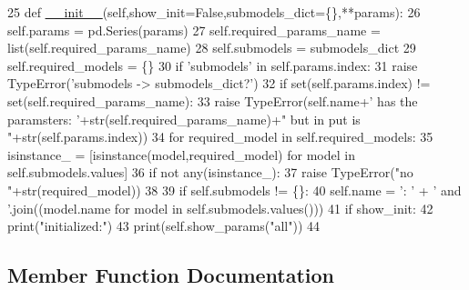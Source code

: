 \begin{DoxyCode}
25     \textcolor{keyword}{def }\hyperlink{classsampler_1_1Sampler_a0ebbb93e5c948bc426658cbdc92bfd12}{\_\_init\_\_}(self,show\_init=False,submodels\_dict=\{\},**params):
26         self.params = pd.Series(params)
27         self.required\_params\_name = list(self.required\_params\_name)
28         self.submodels = submodels\_dict
29         self.required\_models = \{\}
30         \textcolor{keywordflow}{if} \textcolor{stringliteral}{'submodels'} \textcolor{keywordflow}{in} self.params.index:
31             \textcolor{keywordflow}{raise} TypeError(\textcolor{stringliteral}{'submodels -> submodels\_dict?'})
32         \textcolor{keywordflow}{if} set(self.params.index) != set(self.required\_params\_name):
33             \textcolor{keywordflow}{raise} TypeError(self.name+\textcolor{stringliteral}{' has the paramsters: '}+str(self.required\_params\_name)+\textcolor{stringliteral}{" but in put
       is "}+str(self.params.index))
34         \textcolor{keywordflow}{for} required\_model \textcolor{keywordflow}{in} self.required\_models:
35             isinstance\_ =  [isinstance(model,required\_model) \textcolor{keywordflow}{for} model \textcolor{keywordflow}{in} self.submodels.values]
36             \textcolor{keywordflow}{if} \textcolor{keywordflow}{not} any(isinstance\_):
37                 \textcolor{keywordflow}{raise} TypeError(\textcolor{stringliteral}{"no "}+str(required\_model))
38             
39         \textcolor{keywordflow}{if} self.submodels != \{\}:
40             self.name = \textcolor{stringliteral}{': '} + \textcolor{stringliteral}{' and '}.join((model.name \textcolor{keywordflow}{for} model \textcolor{keywordflow}{in} self.submodels.values()))
41         \textcolor{keywordflow}{if} show\_init:
42             print(\textcolor{stringliteral}{"initialized:"})
43             print(self.show\_params(\textcolor{stringliteral}{"all"}))
44 
\end{DoxyCode}


\subsection{Member Function Documentation}
\mbox{\label{classdsph__model_1_1model_a5445148b72ecd03858f543cb7c9c2c6f}} 
